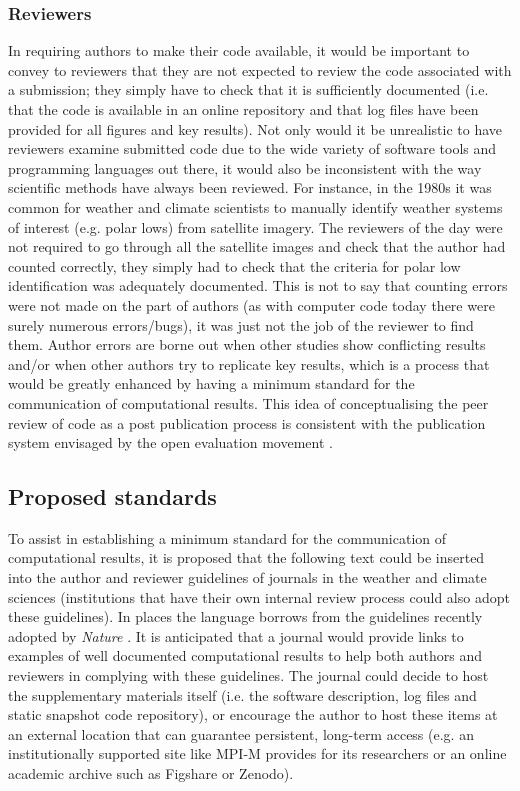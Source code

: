\subsubsection{Reviewers}

In requiring authors to make their code available, it would be important to convey to reviewers that they are not expected to review the code associated with a submission; they simply have to check that it is sufficiently documented (i.e. that the code is available in an online repository and that log files have been provided for all figures and key results). Not only would it be unrealistic to have reviewers examine submitted code due to the wide variety of software tools and programming languages out there, it would also be inconsistent with the way scientific methods have always been reviewed. For instance, in the 1980s it was common for weather and climate scientists to manually identify weather systems of interest (e.g. polar lows) from satellite imagery. The reviewers of the day were not required to go through all the satellite images and check that the author had counted correctly, they simply had to check that the criteria for polar low identification was adequately documented. This is not to say that counting errors were not made on the part of authors (as with computer code today there were surely numerous errors/bugs), it was just not the job of the reviewer to find them. Author errors are borne out when other studies show conflicting results and/or when other authors try to replicate key results, which is a process that would be greatly enhanced by having a minimum standard for the communication of computational results. This idea of conceptualising the peer review of code as a post publication process is consistent with the publication system envisaged by the open evaluation movement \citep[e.g.][]{Kriegeskorte2012}. 
  
\subsection{Proposed standards}

To assist in establishing a minimum standard for the communication of computational results, it is proposed that the following text could be inserted into the author and reviewer guidelines of journals in the weather and climate sciences (institutions that have their own internal review process could also adopt these guidelines). In places the language borrows from the guidelines recently adopted by \textit{Nature} \citep{Nature2014}. It is anticipated that a journal would provide links to examples of well documented computational results to help both authors and reviewers in complying with these guidelines. The journal could decide to host the supplementary materials itself (i.e. the software description, log files and static snapshot code repository), or encourage the author to host these items at an external location that can guarantee persistent, long-term access (e.g. an institutionally supported site like MPI-M provides for its researchers or an online academic archive such as Figshare or Zenodo).


